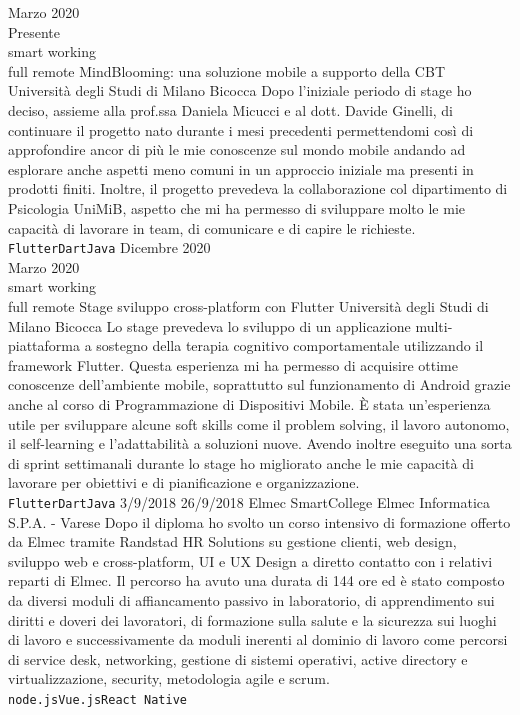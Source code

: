 \documentclass[9pt]{developercv} %
\begin{document}
\begin{entrylist}
	
	\entry
		{Marzo 2020 \\ Presente \\\footnotesize{smart working}\\\footnotesize{full remote}}
		{MindBlooming: una soluzione mobile a supporto della CBT}
		{Università degli Studi di Milano Bicocca}
		{Dopo l'iniziale periodo di stage ho deciso, assieme alla prof.ssa Daniela Micucci e al dott. Davide Ginelli, di continuare il progetto nato durante i mesi precedenti permettendomi così di approfondire ancor di più le mie conoscenze sul mondo mobile andando ad esplorare anche aspetti meno comuni in un approccio iniziale ma presenti in prodotti finiti. Inoltre, il progetto prevedeva la collaborazione col dipartimento di Psicologia UniMiB, aspetto che mi ha permesso di sviluppare molto le mie capacità di lavorare in team, di comunicare e di capire le richieste. \\ \texttt{Flutter}\slashsep\texttt{Dart}\slashsep\texttt{Java}}
	\entry
		{Dicembre 2020 \\ Marzo 2020\\\footnotesize{smart working}\\\footnotesize{full remote}}
		{Stage sviluppo cross-platform con Flutter}
		{Università degli Studi di Milano Bicocca}
		{Lo stage prevedeva lo sviluppo di un applicazione multi-piattaforma a sostegno della terapia cognitivo comportamentale utilizzando il framework Flutter. Questa esperienza mi ha permesso di acquisire ottime conoscenze dell'ambiente mobile, soprattutto sul funzionamento di Android grazie anche al corso di Programmazione di Dispositivi Mobile. È stata un'esperienza utile per sviluppare alcune soft skills come il problem solving, il lavoro autonomo, il self-learning e l'adattabilità a soluzioni nuove. Avendo inoltre eseguito una sorta di sprint settimanali durante lo stage ho migliorato anche le mie capacità di lavorare per obiettivi e di pianificazione e organizzazione.  \\ \texttt{Flutter}\slashsep\texttt{Dart}\slashsep\texttt{Java}}
	\entry
		{3/9/2018  26/9/2018}
		{Elmec SmartCollege}
		{Elmec Informatica S.P.A. - Varese}
		{Dopo il diploma ho svolto un corso intensivo di formazione offerto da Elmec tramite Randstad HR Solutions su gestione clienti, web design, sviluppo web e cross-platform, UI e UX Design a diretto contatto con i relativi reparti di Elmec. Il percorso ha avuto una durata di 144 ore ed è stato composto da diversi moduli di affiancamento passivo in laboratorio, di apprendimento sui diritti e doveri dei lavoratori, di formazione sulla salute e la sicurezza sui luoghi di lavoro e successivamente da moduli inerenti al dominio di lavoro come percorsi di service desk, networking, gestione di sistemi operativi, active directory e virtualizzazione, security, metodologia agile e scrum.\\ \texttt{node.js}\slashsep\texttt{Vue.js}\slashsep\texttt{React Native}}

\end{entrylist}
\end{document}

